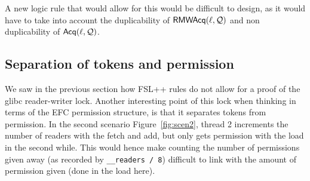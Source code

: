 A new logic rule that would allow for this would be difficult to design, as it would have to take into account the duplicability of $\operatorname{\mathsf{RMWAcq}}(\ell, \mathcal{Q})$ and non duplicability of $\operatorname{\mathsf{Acq}}(\ell, \mathcal{Q})$.

	\subsection{Separation of tokens and permission}
We saw in the previous section how FSL++ rules do not allow for a proof of the glibc reader-writer lock. Another interesting point of this lock when thinking in terms of the EFC permission structure, is that it separates tokens from permission. In the second scenario Figure~\ref{fig:scen2}, thread 2 increments the number of readers with the fetch and add, but only gets permission with the load in the second while. This would hence make counting the number of permissions given away (as recorded by \texttt{\_\_readers / 8}) difficult to link with the amount of permission given (done in the load here).
